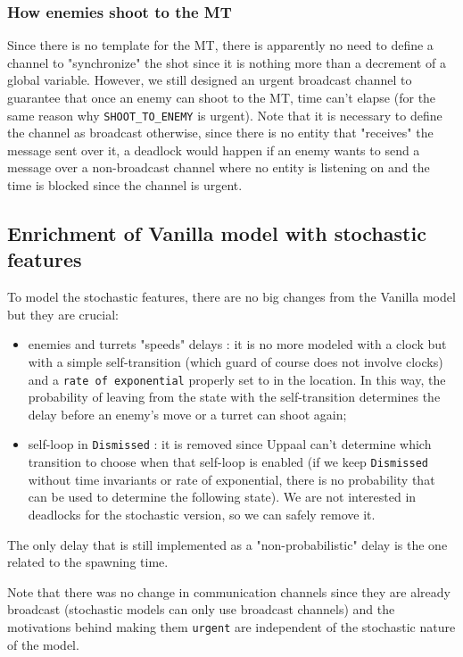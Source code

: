 \documentclass[
10pt, %
a4paper, %
oneside, %
headinclude,footinclude, %
BCOR5mm, %
]{scrartcl}
\begin{document}
			\subsubsection{How enemies shoot to the MT}
				Since there is no template for the MT, there is apparently no need to define a channel to "synchronize" the shot since it is nothing more than a decrement of a global variable. However, we still designed an urgent broadcast channel to guarantee that once an enemy can shoot to the MT, time can't elapse (for the same reason why \texttt{SHOOT\_TO\_ENEMY} is urgent). Note that it is necessary to define the channel as broadcast otherwise, since there is no entity that "receives" the message sent over it, a deadlock would happen if an enemy wants to send a message over a non-broadcast channel where no entity is listening on and the time is blocked since the channel is urgent.
		\subsection{Enrichment of Vanilla model with stochastic features}
			To model the stochastic features, there are no big changes from the Vanilla model but they are crucial:
			\begin{itemize}
				\item enemies and turrets "speeds" delays : it is no more modeled with a clock but with a simple self-transition (which guard of course does not involve clocks) and a \texttt{rate of exponential} properly set to in the location. In this way, the probability of leaving from the state with the self-transition determines the delay before an enemy's move or a turret can shoot again;
				\item self-loop in \texttt{Dismissed} : it is removed since Uppaal can't determine which transition to choose when that self-loop is enabled (if we keep \texttt{Dismissed} without time invariants or rate of exponential, there is no probability that can be used to determine the following state). We are not interested in deadlocks for the stochastic version, so we can safely remove it.
			\end{itemize}
			The only delay that is still implemented as a "non-probabilistic" delay is the one related to the spawning time.
			
			Note that there was no change in communication channels since they are already broadcast (stochastic models can only use broadcast channels) and the motivations behind making them \texttt{urgent} are independent of the stochastic nature of the model.
\end{document}
